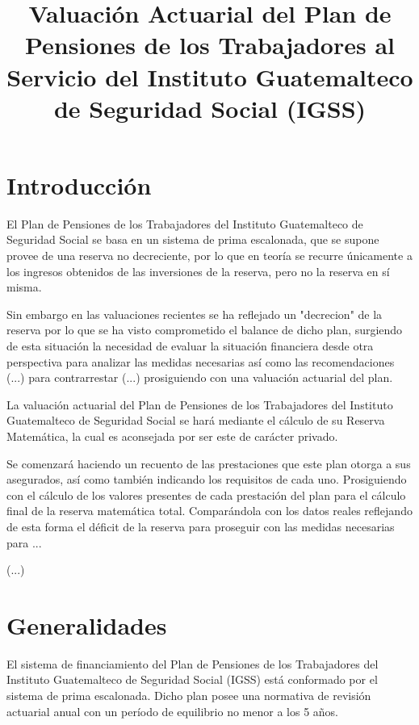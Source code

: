 \documentclass[12pt,letterpaper,titlepage]{article}
\title{Valuación Actuarial del Plan de Pensiones de los Trabajadores al Servicio del Instituto Guatemalteco de Seguridad Social (IGSS)}
\begin{document}
\begin{titlepage}
	\renewcommand{\thepage}{}
	\pagestyle{empty}
	\maketitle
\end{titlepage}\newpage
\setcounter{page}{2}
\tableofcontents
\newpage
\nocite{*}
\section{Introducción}

El Plan de Pensiones de los Trabajadores del Instituto Guatemalteco de Seguridad Social se basa en un sistema de prima escalonada, que se supone provee de una reserva no decreciente, por lo que en teoría se recurre únicamente a los ingresos obtenidos de las inversiones de la reserva, pero no la reserva en sí misma. 

Sin embargo en las valuaciones recientes se ha reflejado un "decrecion" de la reserva por lo que se ha visto comprometido el balance de dicho plan, surgiendo de esta situación la necesidad de evaluar la situación financiera desde otra perspectiva para analizar las medidas necesarias así como las recomendaciones (...) para contrarrestar (...) prosiguiendo con una valuación actuarial del plan.

La valuación actuarial del Plan de Pensiones de los Trabajadores del Instituto Guatemalteco de Seguridad Social se hará mediante el cálculo de su Reserva Matemática, la cual es aconsejada por ser este de carácter privado.

Se comenzará haciendo un recuento de las prestaciones que este plan otorga a sus asegurados, así como también indicando los requisitos de cada uno. Prosiguiendo con el cálculo de los valores presentes de cada prestación del plan para el cálculo final de la reserva matemática total. Comparándola con los datos reales reflejando de esta forma el déficit de la reserva para proseguir con las medidas necesarias para ...

(...)

\newpage
\section{Generalidades}

El sistema de financiamiento del Plan de Pensiones de los Trabajadores del Instituto Guatemalteco de Seguridad Social (IGSS) está conformado por el sistema de prima escalonada. Dicho plan posee una normativa de revisión actuarial anual con un período de equilibrio no menor a los 5 años. 
\end{document}
